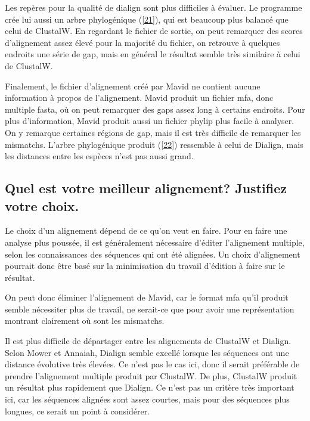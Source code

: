 \documentclass[11pt]{article} %
\renewcommand{\thesubsection}{\alph{subsection}}
\begin{document}
Les repères pour la qualité de dialign sont plus difficiles à évaluer. Le programme crée lui aussi un arbre phylogénique (\ref{21}),
qui est beaucoup plus balancé que celui de ClustalW. En regardant le fichier de sortie, on peut remarquer des scores 
d'alignement assez élevé pour la majorité du fichier, on retrouve à quelques endroits une série de gap, mais en général le résultat
semble très similaire à celui de ClustalW.

Finalement, le fichier d'alignement créé par Mavid ne contient aucune information à propos de l'alignement. Mavid produit un fichier
mfa, donc multiple fasta, où on peut remarquer des gaps assez long à certains endroits. Pour plus d'information, Mavid produit
aussi un fichier phylip plus facile à analyser. On y remarque certaines régions de gap, mais il est très difficile
de remarquer les mismatchs. L'arbre phylogénique produit (\ref{22}) ressemble à celui de Dialign, mais les distances entre les
espèces n'est pas aussi grand.

\subsection[Meilleur alignement]{Quel est votre meilleur alignement? Justifiez votre choix.}

Le choix d'un alignement dépend de ce qu'on veut en faire. Pour en faire une analyse plus poussée, il est
généralement nécessaire d'éditer l'alignement multiple, selon les connaissances des séquences qui ont été
alignées. Un choix d'alignement pourrait donc être basé sur la minimisation du travail d'édition à faire
sur le résultat.

On peut donc éliminer l'alignement de Mavid, car le format mfa qu'il produit semble nécessiter plus de
travail, ne serait-ce que pour avoir une représentation montrant clairement où sont les mismatchs.

Il est plus difficile de départager entre les alignements de ClustalW et Dialign. Selon Mower et Annaiah, 
Dialign semble excellé lorsque les séquences ont une distance évolutive très élevées. Ce n'est pas le cas
ici, donc il serait préférable de prendre l'alignement multiple produit par ClustalW. De plus, ClustalW
produit un résultat plus rapidement que Dialign. Ce n'est pas un critère très important ici, car
les séquences alignées sont assez courtes, mais pour des séquences plus longues, ce serait un
point à considérer.

\begingroup
\renewcommand{\appendix}{%
    \renewcommand{\thesubsection}{Annexe \arabic{subsection}}
}
\end{document}
